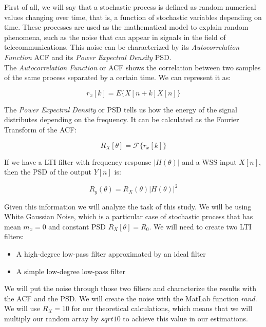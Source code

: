 \documentclass[a4paper,11pt]{article}
\begin{document}
First of all, we will say that a stochastic process is defined as random
numerical values changing over time, that is, a function of stochastic
variables depending on time. These processes are used as the mathematical model
to explain random phenomena, such as the noise that can appear in signals in
the field of telecommunications. This noise can be characterized by its
\textit{Autocorrelation Function} ACF and its \textit{Power Expectral Density}
PSD. \\

The \textit{Autocorrelation Function} or ACF shows the correlation between two
samples of the same process separated by a certain time. We can represent it as:

\begin{equation}\label{eq:ACF}
   r_x[k] = E\{X[n+k]X[n]\}
\end{equation}

The \textit{Power Expectral Density} or PSD tells us how the energy of the
signal distributes depending on the frequency. It can be calculated as the
Fourier Transform of the ACF:

\begin{equation}\label{eq:PSD}
   R_X[\theta] = \mathcal{F}\{r_x[k]\}
\end{equation}

If we have a LTI filter with frequency response $|H(\theta)|$ and a WSS input
$X[n]$, then the PSD of the output $Y[n]$ is: \

\begin{equation}\label{eq:LTI}
   R_y(\theta) = R_X(\theta) |H(\theta)|^2
\end{equation}

Given this information we will analyze the task of this study. We will be
using White Gaussian Noise, which is a particular case of stochastic process
that has mean $m_x = 0$ and constant PSD $R_X[\theta] = R_0$.
We will need to create two LTI filters:

\begin{itemize}
  \item A high-degree low-pass filter approximated by an ideal filter
  \item A simple low-degree low-pass filter
\end{itemize}

We will put the noise through those two filters and characterize the
results with the ACF and the PSD. We will create the noise with the MatLab
function \textit{rand}. We will use $R_X=10$ for our theoretical calculations,
which means that we will multiply our random array by $sqrt{10}$ to achieve
this value in our estimations.
\end{document}

